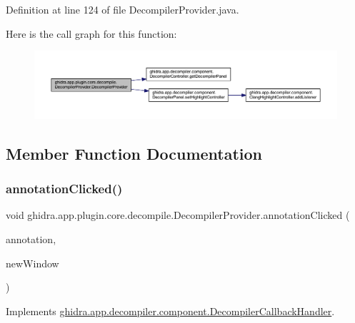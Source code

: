 Definition at line 124 of file Decompiler\+Provider.\+java.

Here is the call graph for this function\+:
\nopagebreak
\begin{figure}[H]
\begin{center}
\leavevmode
\includegraphics[width=350pt]{classghidra_1_1app_1_1plugin_1_1core_1_1decompile_1_1_decompiler_provider_abceef9c1daf26284a5931d893fea0683_cgraph}
\end{center}
\end{figure}


\subsection{Member Function Documentation}
\mbox{\label{classghidra_1_1app_1_1plugin_1_1core_1_1decompile_1_1_decompiler_provider_a846c46957aac9b31e7fcb6fa8566f0fb}} 
\subsubsection{\texorpdfstring{annotationClicked()}{annotationClicked()}}
{\footnotesize\ttfamily void ghidra.\+app.\+plugin.\+core.\+decompile.\+Decompiler\+Provider.\+annotation\+Clicked (\begin{DoxyParamCaption}\item[{Annotated\+Text\+Field\+Element}]{annotation,  }\item[{boolean}]{new\+Window }\end{DoxyParamCaption})\hspace{0.3cm}{\ttfamily [inline]}}



Implements \mbox{\hyperlink{interfaceghidra_1_1app_1_1decompiler_1_1component_1_1_decompiler_callback_handler_a9b7c60460fed31e218b66a0493b43826}{ghidra.\+app.\+decompiler.\+component.\+Decompiler\+Callback\+Handler}}.



